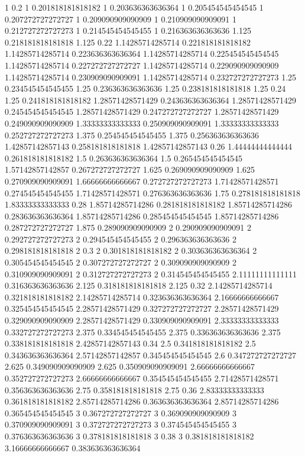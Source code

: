 {1 0.2
1 0.201818181818182
1 0.203636363636364
1 0.205454545454545
1 0.207272727272727
1 0.209090909090909
1 0.210909090909091
1 0.212727272727273
1 0.214545454545455
1 0.216363636363636
1.125 0.218181818181818
1.125 0.22
1.14285714285714 0.221818181818182
1.14285714285714 0.223636363636364
1.14285714285714 0.225454545454545
1.14285714285714 0.227272727272727
1.14285714285714 0.229090909090909
1.14285714285714 0.230909090909091
1.14285714285714 0.232727272727273
1.25 0.234545454545455
1.25 0.236363636363636
1.25 0.238181818181818
1.25 0.24
1.25 0.241818181818182
1.28571428571429 0.243636363636364
1.28571428571429 0.245454545454545
1.28571428571429 0.247272727272727
1.28571428571429 0.249090909090909
1.33333333333333 0.250909090909091
1.33333333333333 0.252727272727273
1.375 0.254545454545455
1.375 0.256363636363636
1.42857142857143 0.258181818181818
1.42857142857143 0.26
1.44444444444444 0.261818181818182
1.5 0.263636363636364
1.5 0.265454545454545
1.57142857142857 0.267272727272727
1.625 0.269090909090909
1.625 0.270909090909091
1.66666666666667 0.272727272727273
1.71428571428571 0.274545454545455
1.71428571428571 0.276363636363636
1.75 0.278181818181818
1.83333333333333 0.28
1.85714285714286 0.281818181818182
1.85714285714286 0.283636363636364
1.85714285714286 0.285454545454545
1.85714285714286 0.287272727272727
1.875 0.289090909090909
2 0.290909090909091
2 0.292727272727273
2 0.294545454545455
2 0.296363636363636
2 0.298181818181818
2 0.3
2 0.301818181818182
2 0.303636363636364
2 0.305454545454545
2 0.307272727272727
2 0.309090909090909
2 0.310909090909091
2 0.312727272727273
2 0.314545454545455
2.11111111111111 0.316363636363636
2.125 0.318181818181818
2.125 0.32
2.14285714285714 0.321818181818182
2.14285714285714 0.323636363636364
2.16666666666667 0.325454545454545
2.28571428571429 0.327272727272727
2.28571428571429 0.329090909090909
2.28571428571429 0.330909090909091
2.33333333333333 0.332727272727273
2.375 0.334545454545455
2.375 0.336363636363636
2.375 0.338181818181818
2.42857142857143 0.34
2.5 0.341818181818182
2.5 0.343636363636364
2.57142857142857 0.345454545454545
2.6 0.347272727272727
2.625 0.349090909090909
2.625 0.350909090909091
2.66666666666667 0.352727272727273
2.66666666666667 0.354545454545455
2.71428571428571 0.356363636363636
2.75 0.358181818181818
2.75 0.36
2.83333333333333 0.361818181818182
2.85714285714286 0.363636363636364
2.85714285714286 0.365454545454545
3 0.367272727272727
3 0.369090909090909
3 0.370909090909091
3 0.372727272727273
3 0.374545454545455
3 0.376363636363636
3 0.378181818181818
3 0.38
3 0.381818181818182
3.16666666666667 0.383636363636364
}
